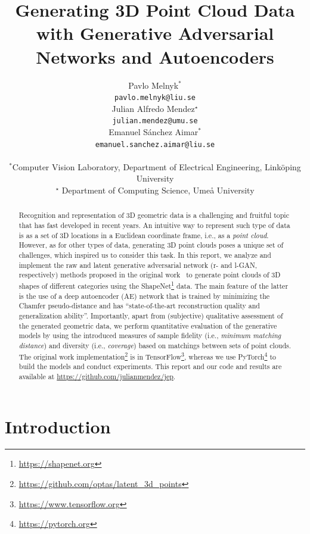 \documentclass[12pt]{article}
\title{Generating 3D Point Cloud Data with Generative Adversarial Networks and Autoencoders}
\author{
    Pavlo Melnyk$^*$ \\
    \texttt{pavlo.melnyk@liu.se} \\
    \And
    Julian Alfredo Mendez$^\star $ \\
    \texttt{julian.mendez@umu.se} \\
    \And
    Emanuel S\'{a}nchez Aimar$^*$ \\
    \texttt{emanuel.sanchez.aimar@liu.se} \\
    \\
    {\small $^*$Computer Vision Laboratory, Department of Electrical Engineering, Linköping University} \\
    {\small $^\star$ Department of Computing Science, Ume{\aa} University}
}
\newcommand{\contentdescription}[1]{}
\begin{document}
    \maketitle

    \begin{abstract}
        \contentdescription{
            Abstract (5-10\%):
            Give an overview of what you have done in the project with the key results and findings of your work.
            Should be no more than 300 words.
        }

        Recognition and representation of 3D geometric data is a challenging and fruitful topic that has fast developed in recent years. An intuitive way to represent such type of data is as a set of 3D locations in a Euclidean coordinate frame, i.e., as a \textit{point cloud}. However, as for other types of data, generating 3D point clouds poses a unique set of challenges, which inspired us to consider this task.
        In this report,  we analyze and implement the raw and latent generative adversarial network (r- and l-GAN, respectively) methods proposed in the original work~\cite{pmlr-v80-achlioptas18a} to generate point clouds of 3D shapes of different categories using the ShapeNet\footnote{\url{https://shapenet.org}} data. The main feature of the latter is the use of a deep autoencoder (AE) network that is trained by minimizing the Chamfer pseudo-distance and has ``state-of-the-art reconstruction quality and generalization ability''.
        Importantly, apart from (subjective) qualitative assessment of the generated geometric data, we perform quantitative evaluation of the generative models by using the introduced measures of sample fidelity (i.e., \textit{minimum matching distance}) and diversity (i.e., \textit{coverage}) based on matchings between sets of point clouds.
        The original work implementation\footnote{\url{https://github.com/optas/latent_3d_points}} is in TensorFlow\footnote{\url{https://www.tensorflow.org}}, whereas we use PyTorch\footnote{\url{https://pytorch.org}} to build the models and conduct experiments.
        This report and our code and results are available at \url{https://github.com/julianmendez/jep}.
    \end{abstract}


    \section{Introduction}

    \contentdescription{
        Introduction (5-15\%):
        Describe the problem, the approach of the paper, the experiments, and the results.
        At the high-level talk about what you worked on in your project and why it is important.
        Then give an overview of your results.
    }
\end{document}
